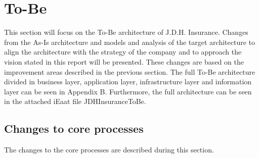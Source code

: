 \section{To-Be}
\label{sec:to_be}
This section will focus on the To-Be architecture of J.D.H. Insurance. Changes from the As-Is architecture and models and analysis of the target architecture to align the architecture with the strategy of the company and to approach the vision stated in this report will be presented. These changes are based on the improvement areas described in the previous section. The full To-Be architecture divided in business layer, application layer, infrastructure layer and information layer can be seen in Appendix B. Furthermore, the full architecture can be seen in the attached iEaat file JDHInsuranceToBe.
\subsection{Changes to core processes}
The changes to the core processes are described during this section.
